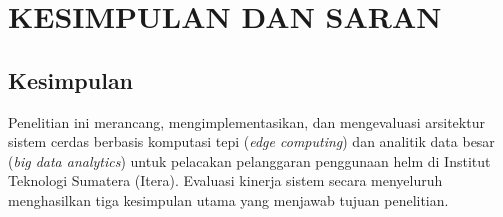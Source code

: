 \chapter{KESIMPULAN DAN SARAN}
\label{chap:kesimpulan}

\section{Kesimpulan}
\label{sec:kesimpulan}

Penelitian ini merancang, mengimplementasikan, dan mengevaluasi arsitektur sistem cerdas berbasis komputasi tepi (\textit{edge computing}) dan analitik data besar (\textit{big data analytics}) untuk pelacakan pelanggaran penggunaan helm di Institut Teknologi Sumatera (Itera). Evaluasi kinerja sistem secara menyeluruh menghasilkan tiga kesimpulan utama yang menjawab tujuan penelitian.

